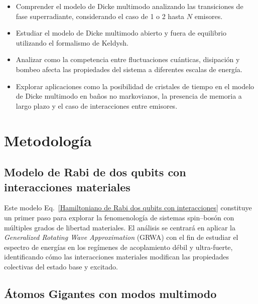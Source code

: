 \documentclass[onecolumn,notitlepage,letterpaper,aps,pra,12pt]{article}
\numberwithin{equation}{section}
\begin{document}
\begin{itemize}
    \item Comprender el modelo de Dicke multimodo analizando las transiciones de fase superradiante, considerando el caso de 1 o 2 hasta $N$ emisores.
    \item Estudiar el modelo de Dicke multimodo abierto y fuera de equilibrio utilizando el formalismo de Keldysh. 
    \item Analizar como la competencia entre fluctuaciones cuánticas, disipación y bombeo afecta las propiedades del sistema a diferentes escalas de energía. 
    \item Explorar aplicaciones como la posibilidad de cristales de tiempo en el modelo de Dicke multimodo en baños no markovianos, la presencia de memoria a largo plazo y el caso de interacciones entre emisores. 
\end{itemize}

\section{Metodología}


\subsection{Modelo de Rabi de dos qubits con interacciones materiales}


  

Este modelo Eq.~\eqref{Hamiltoniano de Rabi dos qubits con interacciones} constituye un primer paso para explorar la fenomenología de sistemas spin–bosón con múltiples grados de libertad materiales. El análisis se centrará en aplicar la \textit{Generalized Rotating Wave Approximation} (GRWA) con el fin de estudiar el espectro de energías en los regímenes de acoplamiento débil y ultra-fuerte, identificando cómo las interacciones materiales modifican las propiedades colectivas del estado base y excitado.
 

\subsection{Átomos Gigantes con modos multimodo}
\end{document}
